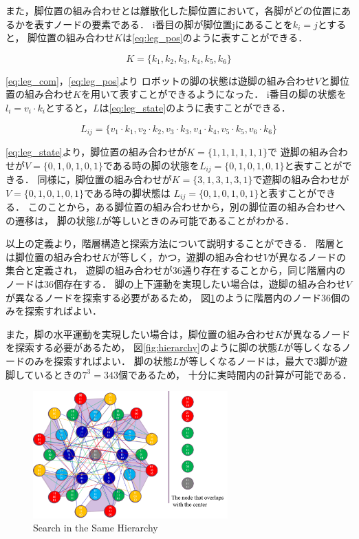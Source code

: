 また，脚位置の組み合わせとは離散化した脚位置において，各脚がどの位置にあるかを表すノードの要素である．
i番目の脚が脚位置jにあることを$k_i = j$とすると，
脚位置の組み合わせ$K$は\eqref{eq:leg_pos}のように表すことができる．

\begin{equation}\label{eq:leg_pos}
  K = \{k_1, k_2, k_3, k_4, k_5, k_6\}
\end{equation}

\noindent\eqref{eq:leg_com}，\eqref{eq:leg_pos}より
ロボットの脚の状態は遊脚の組み合わせ$V$と脚位置の組み合わせ$K$を用いて表すことができるようになった．
i番目の脚の状態を$l_i = v_i \cdot k_i$とすると，$L$は\eqref{eq:leg_state}のように表すことができる．

\begin{equation}\label{eq:leg_state}
  L_{ij} = \{v_1 \cdot k_1, v_2 \cdot k_2, v_3 \cdot k_3, v_4 \cdot k_4, v_5 \cdot k_5, v_6 \cdot k_6\}
\end{equation}

\noindent\eqref{eq:leg_state}より，脚位置の組み合わせが$K = \{1,1,1,1,1,1\}$で
遊脚の組み合わせが$V = \{0,1,0,1,0,1\}$である時の脚の状態を$L_{ij} = \{0,1,0,1,0,1\}$と表すことができる．
同様に，脚位置の組み合わせが$K = \{3,1,3,1,3,1\}$で遊脚の組み合わせが$V = \{0,1,0,1,0,1\}$である時の脚状態は
$L_{ij} = \{0,1,0,1,0,1\}$と表すことができる．
このことから，ある脚位置の組み合わせから，別の脚位置の組み合わせへの遷移は，
脚の状態$L$が等しいときのみ可能であることがわかる．

以上の定義より，階層構造と探索方法について説明することができる．
階層とは脚位置の組み合わせ$K$が等しく，かつ，遊脚の組み合わせ$V$が異なるノードの集合と定義され，
遊脚の組み合わせが36通り存在することから，同じ階層内のノードは36個存在する．
脚の上下運動を実現したい場合は，遊脚の組み合わせ$V$が異なるノードを探索する必要があるため，
図\ref{fig:hierarchy2}のように階層内のノード36個のみを探索すればよい．

また，脚の水平運動を実現したい場合は，脚位置の組み合わせ$K$が異なるノードを探索する必要があるため，
図\ref{fig:hierarchy}のように脚の状態$L$が等しくなるノードのみを探索すればよい．
脚の状態$L$が等しくなるノードは，最大で3脚が遊脚しているときの$7^3 = 343$個であるため，
十分に実時間内の計算が可能である．

\begin{figure}[htbp]
  \begin{center}
    \includegraphics[width=75mm, clip]{figure/chapter2/hierarchy2.png}
    \caption{Search in the Same Hierarchy}
    \label{fig:hierarchy2} %
  \end{center}
\end{figure}


